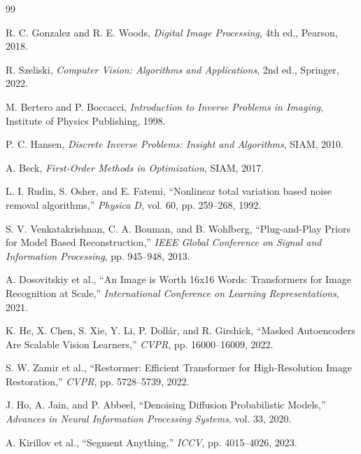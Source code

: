 \documentclass[12pt,openany,oneside]{book}
\begin{document}
\backmatter
\renewcommand{\bibname}{منابع منتخب برای نقشه کتاب و فصل اول}
\begin{thebibliography}{99}
\begin{LTR}

R. C. Gonzalez and R. E. Woods,
\emph{Digital Image Processing}, 4th ed., Pearson, 2018.

R. Szeliski,
\emph{Computer Vision: Algorithms and Applications}, 2nd ed., Springer, 2022.

M. Bertero and P. Boccacci,
\emph{Introduction to Inverse Problems in Imaging}, Institute of Physics Publishing, 1998.

P. C. Hansen,
\emph{Discrete Inverse Problems: Insight and Algorithms}, SIAM, 2010.

A. Beck,
\emph{First-Order Methods in Optimization}, SIAM, 2017.

L. I. Rudin, S. Osher, and E. Fatemi,
``Nonlinear total variation based noise removal algorithms,''
\emph{Physica D}, vol. 60, pp. 259--268, 1992.

S. V. Venkatakrishnan, C. A. Bouman, and B. Wohlberg,
``Plug-and-Play Priors for Model Based Reconstruction,''
\emph{IEEE Global Conference on Signal and Information Processing}, pp. 945--948, 2013.

A. Dosovitskiy et al.,
``An Image is Worth 16x16 Words: Transformers for Image Recognition at Scale,''
\emph{International Conference on Learning Representations}, 2021.

K. He, X. Chen, S. Xie, Y. Li, P. Doll\'ar, and R. Girshick,
``Masked Autoencoders Are Scalable Vision Learners,''
\emph{CVPR}, pp. 16000--16009, 2022.

S. W. Zamir et al.,
``Restormer: Efficient Transformer for High-Resolution Image Restoration,''
\emph{CVPR}, pp. 5728--5739, 2022.

J. Ho, A. Jain, and P. Abbeel,
``Denoising Diffusion Probabilistic Models,''
\emph{Advances in Neural Information Processing Systems}, vol. 33, 2020.

A. Kirillov et al.,
``Segment Anything,''
\emph{ICCV}, pp. 4015--4026, 2023.


\end{LTR}
\end{thebibliography}
\end{document}
